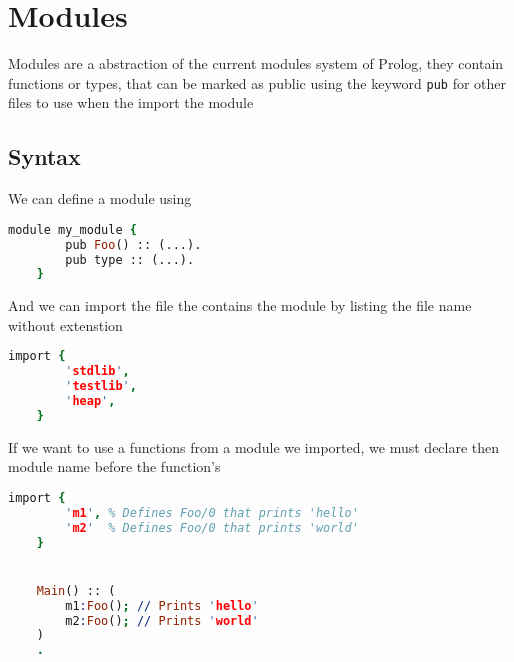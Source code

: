 \section{Modules}

Modules are a abstraction of the current modules system of Prolog, they contain
functions or types, that can be marked as public using the keyword \texttt{pub}
for other files to use when the import the module

\subsection{Syntax}

We can define a module using
\begin{lstlisting}[language =Prolog]
    module my_module {
        pub Foo() :: (...).
        pub type :: (...).
    }
\end{lstlisting}

And we can import the file the contains the module by listing the file name
without extenstion

\begin{lstlisting}[language =Prolog]
    import {
        'stdlib',
        'testlib',
        'heap',
    }
\end{lstlisting}

If we want to use a functions from a module we imported, we must declare 
then module name before the function's


\begin{lstlisting}[language =Prolog]
    import {
        'm1', % Defines Foo/0 that prints 'hello'
        'm2'  % Defines Foo/0 that prints 'world'
    }


    Main() :: (
        m1:Foo(); // Prints 'hello'
        m2:Foo(); // Prints 'world'
    )
    .
\end{lstlisting}





